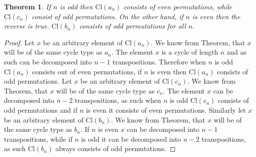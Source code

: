 \documentclass[a4paper,10pt]{article}
\newtheorem{theorem}{Theorem}
\begin{document}
\begin{theorem}
If $n$ is odd then $\textrm{Cl}(a_n)$ consists of even permutations, while $\textrm{Cl}(c_n)$ consist of odd permutations. On the other hand, if $n$ is even then the reverse is true. $\textrm{Cl}(b_n)$ consists of odd permutations for all $n$.     
\end{theorem}
\begin{proof}
Let $x$ be an arbitrary element of $\textrm{Cl}(a_n)$. We know from Theorem, that $x$ will be of the same cycle type as $a_n$. The element $x$ is a cycle of length $n$ and as such can be decomposed into $n-1$ transpositions. Therefore when $n$ is odd $\textrm{Cl}(a_n)$ consists out of even permutations, if $n$ is even then $\textrm{Cl}(a_n)$ consists of odd permutations. Let $x$ be an arbitrary element of $\textrm{Cl}(c_n)$. We know from Theorem, that $x$ will be of the same cycle type as $c_n$. The element $x$ can be decomposed into $n-2$ transpositions, as such when $n$ is odd $\textrm{Cl}(c_n)$ consists of odd permutations and if $n$ is even it consists of even permutations. Similarly let $x$ be an arbitrary element of $\textrm{Cl}(b_n)$. We know from Theorem, that $x$ will be of the same cycle type as $b_n$. If $n$ is even $x$ can be decomposed into $n-1$ transpositions, while if $n$ is odd it can be decomposed into $n-2$ transpositions, as such $\textrm{Cl}(b_n)$ always consists of odd permutations.     
\end{proof}
\end{document}
